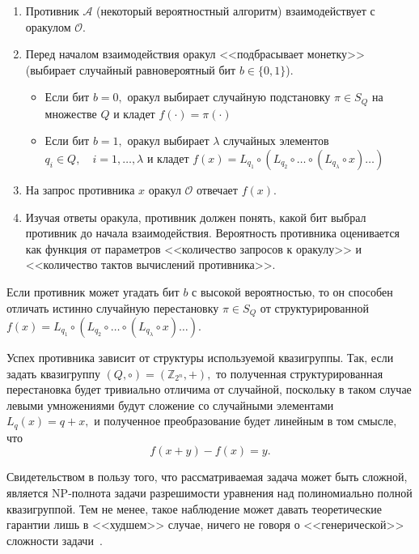     \begin{enumerate}
        \item Противник $\mathcal{A}$ (некоторый вероятностный алгоритм) взаимодействует с оракулом $\mathcal{O}.$

        \item Перед началом взаимодействия оракул <<подбрасывает монетку>> (выбирает случайный равновероятный бит $b \in \{0, 1\}$).

        \begin{itemize}

            \item Если бит $b = 0,$ оракул выбирает случайную подстановку $\pi \in S_Q$ на множестве $Q$
            и кладет $f(\cdot) = \pi(\cdot)$

            \item Если бит $b = 1,$ оракул выбирает $\lambda$ случайных элементов $q_i \in Q, \quad i = 1, \ldots, \lambda$ и кладет 
            \(
                f(x) = L_{q_1} \circ (L_{q_2} \circ \ldots \circ (L_{q_{\lambda}} \circ x) \ldots )
            \)

        \end{itemize}

        \item На запрос противника $x$ оракул $\mathcal{O}$ отвечает $f(x).$

        \item Изучая ответы оракула, противник должен понять, какой бит выбрал противник до начала взаимодействия. Вероятность противника оценивается как функция от параметров <<количество запросов к оракулу>> и <<количество тактов вычислений противника>>.
    \end{enumerate}

    Если противник может угадать бит $b$ с высокой вероятностью, то он способен отличать истинно случайную перестановку $\pi \in S_Q$ от структурированной 
    \(
        f(x) = L_{q_1} \circ (L_{q_2} \circ \ldots \circ (L_{q_{\lambda}} \circ x) \ldots ).
    \)

    Успех противника зависит от структуры используемой квазигруппы. 
    Так, если задать квазигруппу $(Q, \circ) = (\mathbb{Z}_{2^n}, +),$
    то полученная структурированная перестановка будет тривиально отличима от случайной, поскольку в таком случае левыми умножениями будут сложение со случайными элементами $L_q(x) = q + x,$ и полученное преобразование будет линейным в том смысле, что 
    \[
        f(x + y) - f(x) = y.
    \]

    Свидетельством в пользу того, что рассматриваемая задача может быть сложной, является NP-полнота задачи разрешимости уравнения над полиномиально полной квазигруппой.
    Тем не менее, такое наблюдение может давать теоретические гарантии лишь в <<худшем>> случае, ничего не говоря о <<генерической>> сложности задачи~\cite{kapovich2003generic}.

